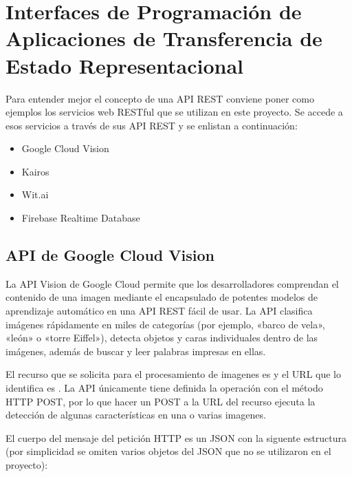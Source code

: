 


\section{Interfaces de Programación de Aplicaciones de Transferencia de Estado Representacional}
\label{\detokenize{chapter_one/apis_rest:interfaces-de-programacion-de-aplicaciones-de-transferencia-de-estado-representacional}}\label{\detokenize{chapter_one/apis_rest::doc}}
Para entender mejor el concepto de una API REST conviene poner como ejemplos
los servicios web RESTful que se utilizan en este proyecto. Se accede
a esos servicios a través de sus API REST y se enlistan a continuación:
\begin{itemize}
\item {} 
Google Cloud Vision

\item {} 
Kairos

\item {} 
Wit.ai

\item {} 
Firebase Realtime Database

\end{itemize}


\subsection{API de Google Cloud Vision}
\label{\detokenize{chapter_one/apis_rest:api-de-google-cloud-vision}}
La API Vision de Google Cloud permite que los desarrolladores comprendan el
contenido de una imagen mediante el encapsulado de potentes modelos de
aprendizaje automático en una API REST fácil de usar. La API clasifica
imágenes rápidamente en miles de categorías (por ejemplo, «barco de vela»,
«león» o «torre Eiffel»), detecta objetos y caras individuales dentro de las
imágenes, además de buscar y leer palabras impresas en ellas.

El recurso que se solicita para el procesamiento de imagenes es  y
el URL que lo identifica es .
La API únicamente tiene definida la operación con el método HTTP POST,
por lo que hacer un POST a la URL del recurso ejecuta la detección de algunas
características en una o varias imagenes.

El cuerpo del mensaje del petición HTTP es un JSON con la siguente estructura
(por simplicidad se omiten varios objetos del JSON que no se utilizaron en el
proyecto):


